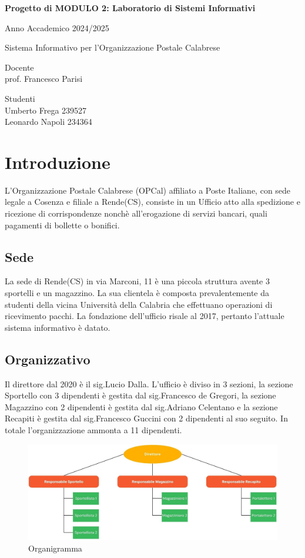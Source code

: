 \documentclass{article}
\author{Umberto Frega, Leonardo Napoli}
\begin{document}
\begin{titlepage}
    \centering
    {\Large \bfseries Progetto di MODULO 2: Laboratorio di Sistemi Informativi\par}
    {\Large Anno Accademico 2024/2025 \par}
    \vspace{1cm} %
    \vfill
    {\huge Sistema Informativo per l'Organizzazione Postale Calabrese\par}
    \vfill
\noindent
\begin{minipage}[t]{0.5\textwidth}
    \raggedright
     Docente \\  prof. Francesco Parisi
\end{minipage}%
\hfill
\begin{minipage}[t]{0.4\textwidth}
    \raggedleft
     Studenti \\ Umberto Frega 239527 \\ Leonardo Napoli 234364
\end{minipage}
    
\end{titlepage}

\section{Introduzione}
L'Organizzazione Postale Calabrese (OPCal) affiliato a Poste Italiane, con sede legale a Cosenza e filiale a Rende(CS), consiste in un Ufficio atto alla spedizione e ricezione di corrispondenze nonchè all'erogazione di servizi bancari, quali pagamenti di bollette o bonifici. 
\subsection{Sede}
La sede di Rende(CS) in via Marconi, 11 è una piccola struttura avente 3 sportelli e un magazzino. La sua clientela è composta prevalentemente da studenti della vicina Università della Calabria che effettuano operazioni di ricevimento pacchi. La fondazione dell'ufficio risale al 2017, pertanto l'attuale sistema informativo è datato. 
\subsection{Organizzativo}
Il direttore dal 2020 è il sig.Lucio Dalla. L'ufficio è diviso in 3 sezioni, la sezione Sportello con 3 dipendenti è gestita dal sig.Francesco de Gregori, la sezione Magazzino con 2 dipendenti è gestita dal sig.Adriano Celentano e la sezione Recapiti è gestita dal sig.Francesco Guccini con 2 dipendenti al suo seguito. In totale l'organizzazione ammonta a 11 dipendenti.
\begin{figure}[h]
    \centering
    \includegraphics[width=0.8\linewidth]{assets/organigramma.jpg}
    \caption{Organigramma}
    \label{fig:enter_label}
\end{figure}
\end{document}
